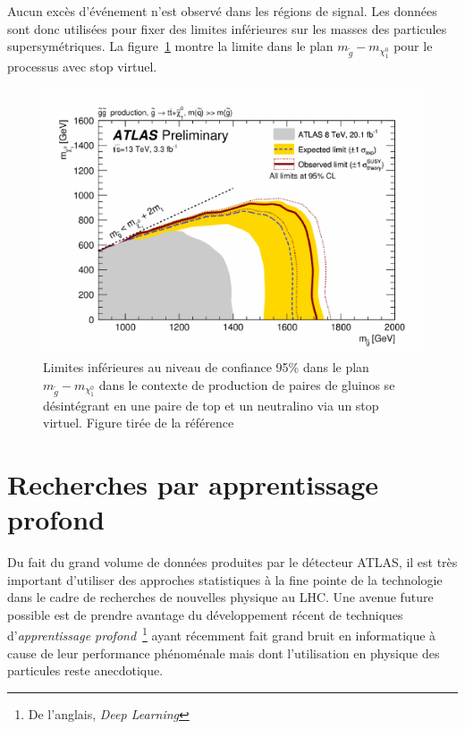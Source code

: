 Aucun excès d'événement n'est observé dans les régions de signal.  Les
données sont donc utilisées pour fixer des limites inférieures sur les
masses des particules supersymétriques. La figure~\ref{fig:limit}
montre la limite dans le plan $m_{\tilde{g}}-m_{\chi_1^0}$ pour le
processus avec stop virtuel.

\begin{figure}[h!]
  \centering
  \includegraphics[width=\textwidth]{limit.pdf}
  \caption{Limites inférieures au niveau de confiance 95\% dans le
    plan $m_{\tilde{g}}-m_{\chi_1^0}$ dans le contexte de production
    de paires de gluinos se désintégrant en une paire de top et un
    neutralino via un stop virtuel.  Figure tirée de la
    référence~\cite{ATLAS-CONF-2015-067}}
  \label{fig:limit}
\end{figure}

\clearpage{}

\section{Recherches par apprentissage profond}
\label{sec:susy_atlas:dl}

Du fait du grand volume de données produites par le détecteur ATLAS,
il est très important d'utiliser des approches statistiques à la
fine pointe de la technologie dans le cadre de recherches de nouvelles
physique au LHC. Une avenue future possible est de prendre avantage du
développement récent de techniques d'\emph{apprentissage
  profond}~\footnote{De l'anglais, \emph{Deep Learning}} ayant
récemment fait grand bruit en informatique à cause de leur performance
phénoménale mais dont l'utilisation en physique des particules reste
anecdotique.
 
